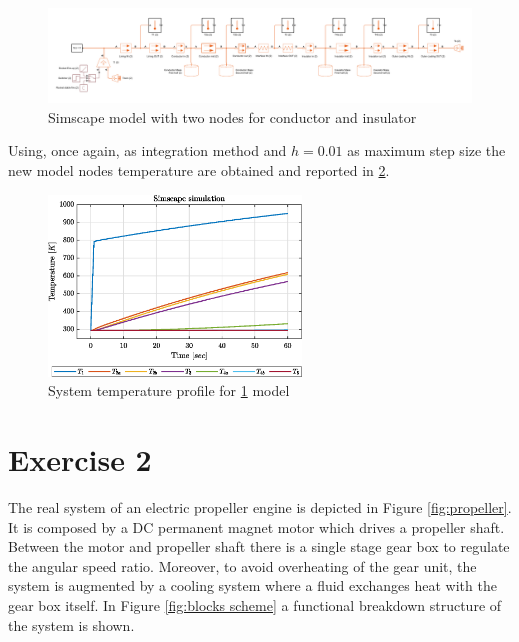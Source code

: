\documentclass[11pt,a4paper,oneside]{article}
\begin{document}
\begin{figure}[H]
    \centering
    \includegraphics*[width=1\textwidth, keepaspectratio]{Figures/ex1_simscapeCase2.pdf}
    \caption[]{\label{fig:ex1_simscapeCase2} Simscape model with two nodes for conductor and insulator}
\end{figure}

Using, once again,  as integration method and $h=0.01$ as maximum step size the new model nodes temperature are obtained and reported in \cref{fig:ex1_tempCase2}.
\begin{figure}[H]
    \centering
    \includegraphics*[width=0.6\textwidth, keepaspectratio]{Figures/ex1_tempCase2.eps}
    \caption[]{\label{fig:ex1_tempCase2} System temperature profile for \cref{fig:ex1_simscapeCase2} model}
\end{figure}


\clearpage
\section{Exercise 2}
The real system of an electric propeller engine is depicted in Figure \ref{fig:propeller}.
It is composed by a DC permanent magnet motor which drives a propeller shaft.
Between the motor and propeller shaft there is a single stage gear box to regulate the angular speed ratio.
Moreover, to avoid overheating of the gear unit, the system is augmented by a cooling system where a fluid exchanges heat with the gear box itself.
In Figure \ref{fig:blocks scheme} a functional breakdown structure of the system is shown. 
\end{document}
